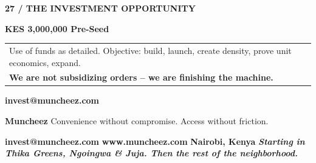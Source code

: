 \documentclass[aspectratio=169,11pt]{beamer}
\begin{document}
\begin{frame}
\textsf{\scriptsize\bfseries\color{LinkBlue}\uppercase{27 / The Investment Opportunity}}
\vspace{0.2cm}

{\fontsize{22}{28}\sffamily\bfseries\color{CorporateNavy} KES 3,000,000 Pre-Seed}

\vspace{0.8cm}
\begin{tabularx}{\textwidth}{@{} X @{}}
    \textsf{\small Use of funds as detailed. Objective: build, launch, create density, prove unit economics, expand.} \\
    \textsf{\small \textbf{We are not subsidizing orders – we are finishing the machine.}}
\end{tabularx}
\vspace{0.6cm}
\begin{center}
    \textsf{\small\bfseries\color{LinkBlue} invest@muncheez.com}
\end{center}
\end{frame}

\begin{frame}
\vfill
\begin{center}
    {\fontsize{36}{42}\sffamily\bfseries\color{CorporateNavy} Muncheez}
    \vspace{0.4cm}
    {\fontsize{18}{24}\sffamily\color{DeepCharcoal} Convenience without compromise. Access without friction.}
    \vspace{0.6cm}
    \vspace{0.6cm}
    \textsf{\small\bfseries\color{LinkBlue} invest@muncheez.com} \hspace{0.3cm}\textperiodcentered\hspace{0.3cm} \textsf{\small\bfseries\color{CorporateNavy} www.muncheez.com}
    \vspace{0.4cm}
    \textsf{\scriptsize\bfseries\color{DeepCharcoal} Nairobi, Kenya}
    \vspace{0.4cm}
    \textsf{\tiny\bfseries\color{DeepCharcoal} \textit{Starting in Thika Greens, Ngoingwa \& Juja. Then the rest of the neighborhood.}}
\end{center}
\vfill
\end{frame}
\end{document}
